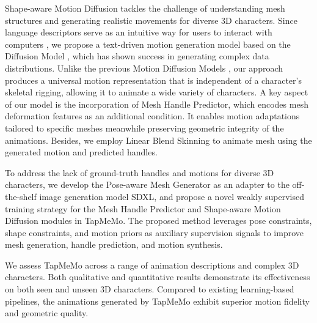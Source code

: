 \documentclass[lettersize,journal]{IEEEtran}
\newcommand{\blu}[1]{\texorpdfstring{{\leavevmode\color{blue}#1}}{#1}}
\begin{document}
Shape-aware Motion Diffusion tackles the challenge of understanding mesh structures and generating realistic movements for diverse 3D characters. Since language descriptors serve as an intuitive way for users to interact with computers \cite{manaris1998natural}, we propose a text-driven motion generation model based on the Diffusion Model \blu{\cite{sohl2015deep, ho2020denoising, zhang2024diff, zhang2025visual, zhang2026leveraging}}, which has shown success in generating complex data distributions. Unlike the previous Motion Diffusion Models \cite{zhang2024motiondiffuse,tevet2022human}, our approach produces a universal motion representation that is independent of a character’s skeletal rigging, allowing it to animate a wide variety of characters. A key aspect of our model is the incorporation of Mesh Handle Predictor, which encodes mesh deformation features as an additional condition. It enables motion adaptations tailored to specific meshes meanwhile preserving geometric integrity of the animations. Besides, we employ Linear Blend Skinning to animate mesh using the generated motion and predicted handles.

To address the lack of ground-truth handles and motions for diverse 3D characters, we develop the Pose-aware Mesh Generator as an adapter to the off-the-shelf image generation model SDXL, and propose a novel weakly supervised training strategy for the Mesh Handle Predictor and Shape-aware Motion Diffusion modules in TapMeMo. The proposed method leverages pose constraints, shape constraints, and motion priors as auxiliary supervision signals to improve mesh generation, handle prediction, and motion synthesis.

We assess TapMeMo across a range of animation descriptions and complex 3D characters. Both qualitative and quantitative results demonstrate its effectiveness on both seen and unseen 3D characters. Compared to existing learning-based pipelines, the animations generated by TapMeMo exhibit superior motion fidelity and geometric quality.
\end{document}
